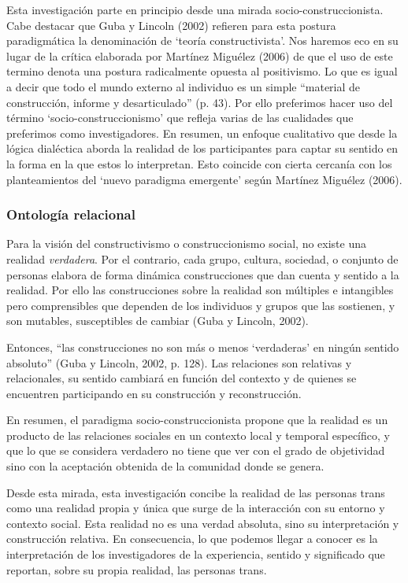 Esta investigación parte en principio desde una mirada socio-construccionista.
Cabe destacar que Guba y Lincoln (2002) refieren para esta postura paradigmática
la denominación de ‘teoría constructivista’.
Nos haremos eco en su lugar de la crítica elaborada por Martínez Miguélez (2006)
de que el uso de este termino denota una postura radicalmente opuesta al
positivismo.
Lo que es igual a decir que todo el mundo externo al individuo es un simple
“material de construcción, informe y desarticulado” (p. 43).
Por ello preferimos hacer uso del término ‘socio-construccionismo’ que refleja
varias de las cualidades que preferimos como investigadores.
En resumen, un enfoque cualitativo que desde la lógica dialéctica aborda la
realidad de los participantes para captar su sentido en la forma en la que estos
lo interpretan.
Esto coincide con cierta cercanía con los planteamientos del ‘nuevo paradigma
emergente’ según Martínez Miguélez (2006).

\subsubsection{Ontología relacional}
Para la visión del constructivismo o construccionismo social, no existe una
realidad \emph{verdadera}.
Por el contrario, cada grupo, cultura, sociedad, o conjunto de personas elabora
de forma dinámica construcciones que dan cuenta y sentido a la realidad.
Por ello las construcciones sobre la realidad son múltiples e intangibles pero
comprensibles que dependen de los individuos y grupos que las sostienen, y son
mutables, susceptibles de cambiar (Guba y Lincoln, 2002).

Entonces, “las construcciones no son más o menos ‘verdaderas’ en ningún sentido
absoluto” (Guba y Lincoln, 2002, p. 128).
Las relaciones son relativas y relacionales, su sentido cambiará en función del
contexto y de quienes se encuentren participando en su construcción y
reconstrucción.

En resumen, el paradigma socio-construccionista propone que la realidad es un
producto de las relaciones sociales en un contexto local y temporal específico,
y que lo que se considera verdadero no tiene que ver con el grado de objetividad
sino con la aceptación obtenida de la comunidad donde se genera.

Desde esta mirada, esta investigación concibe la realidad de las personas trans
como una realidad propia y única que surge de la interacción con su entorno y
contexto social.
Esta realidad no es una verdad absoluta, sino su interpretación y construcción
relativa.
En consecuencia, lo que podemos llegar a conocer es la interpretación de los
investigadores de la experiencia, sentido y significado que reportan, sobre su
propia realidad, las personas trans.

